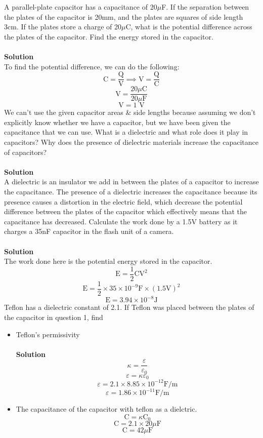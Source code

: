 \documentclass[9pt,addpoints]{exam}
\begin{document}
	\begin{questions}
		\question A parallel-plate capacitor has a capacitance of 20$\mu$F. If the separation between the plates of the capacitor is 20mm, and the plates are squares of side length 3cm. If the plates store a charge of 20$\mu$C, what is the potential difference across the plates of the capacitor. Find the energy stored in the capacitor. \\ \\
		\textbf{Solution}\\
		 To find the potential difference, we can do the following:
		 $$	\text{C}=\dfrac{\text{Q}}{\text{V}}\implies\text{V}=\dfrac{\text{Q}}{\text{C}}$$
		 $$\text{V}=\dfrac{20\mu\text{C}}{20\mu\text{F}}$$
		 $$\text{V}=1\text{ V}$$
		 We can't use the given capacitor areas \& side lengths because assuming we don't explicitly know whether we have a capacitor, but we have been given the capacitance that we can use.
		\question What is a dielectric and what role does it play in capacitors? Why does the presence of dielectric materials increase the capacitance of capacitors?\\ \\
		\textbf{Solution}\\
		A dielectric is an insulator we add in between the plates of a capacitor to increase the capacitance. The presence of a dielectric increases the capacitance because its presence causes a distortion in the electric field, which decrease the potential difference between the plates of the capacitor which effectively means that the capacitance has decreased.
		\question Calculate the work done by a 1.5V battery as it charges a 35nF capacitor in the flash unit of a camera.\\ \\
		\textbf{Solution}\\
		The work done here is the potential energy stored in the capacitor. \\
		$$\text{E}=\dfrac{1}{2}\text{CV}^2$$
		$$\text{E}=\dfrac{1}{2}\times35\times10^{-9}\text{F}\times(1.5\text{V})^2$$
		$$\text{E}=3.94\times10^{-8}\text{J}$$
		\question Teflon has a dielectric constant of 2.1. If Teflon was placed between the plates of the capacitor in question 1, find \begin{itemize}
			\item Teflon's permissivity\\ \\ \textbf{Solution}\\
			$$\kappa=\dfrac{\varepsilon}{\varepsilon_0}$$
			$$\varepsilon=\kappa\varepsilon_0$$
			$$\varepsilon=2.1\times8.85\times10^{-12}\text{F/m}$$
			$$\varepsilon=1.86\times10^{-11}\text{F/m}$$
			\item The capacitance of the capacitor with teflon as a dielctric. 
			$$\text{C}=\kappa\text{C}_0$$
			$$\text{C}=2.1\times20\mu\text{F}$$
			$$\text{C}=42\mu\text{F}$$
		\end{itemize}

\end{questions}
\end{document}
